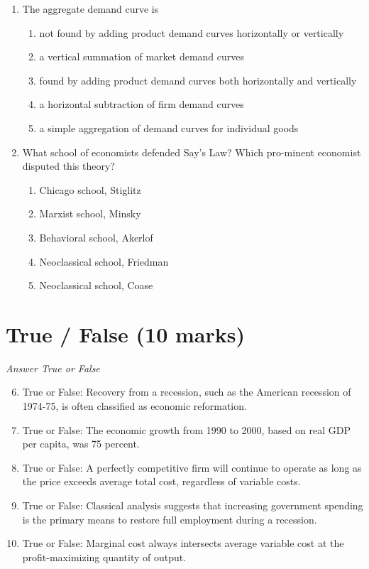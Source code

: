 \documentclass[12pt]{article}
\begin{document}
\begin{enumerate}[label=\arabic*.]
\begin{enumerate}[label=(\alph*)]
\end{enumerate}
\item The aggregate demand curve is
\begin{enumerate}[label=(\alph*)]
    \item not found by adding product demand curves horizontally or vertically
    \item a vertical summation of market demand curves
    \item found by adding product demand curves both horizontally and vertically
    \item a horizontal subtraction of firm demand curves
    \item a simple aggregation of demand curves for individual goods
\end{enumerate}
\item What school of economists defended Say's Law? Which pro-minent economist disputed this theory?
\begin{enumerate}[label=(\alph*)]
    \item Chicago school, Stiglitz
    \item Marxist school, Minsky
    \item Behavioral school, Akerlof
    \item Neoclassical school, Friedman
    \item Neoclassical school, Coase
\end{enumerate}
\end{enumerate}

\section*{True / False (10 marks)}
\textit{Answer True or False}
\begin{enumerate}[label=\arabic*.]
\setcounter{enumi}{5}
\item True or False: Recovery from a recession, such as the American recession of 1974-75, is often classified as economic reformation.
\item True or False: The economic growth from 1990 to 2000, based on real GDP per capita, was 75 percent.
\item True or False: A perfectly competitive firm will continue to operate as long as the price exceeds average total cost, regardless of variable costs.
\item True or False: Classical analysis suggests that increasing government spending is the primary means to restore full employment during a recession.
\item True or False: Marginal cost always intersects average variable cost at the profit-maximizing quantity of output.
\end{enumerate}
\end{document}
